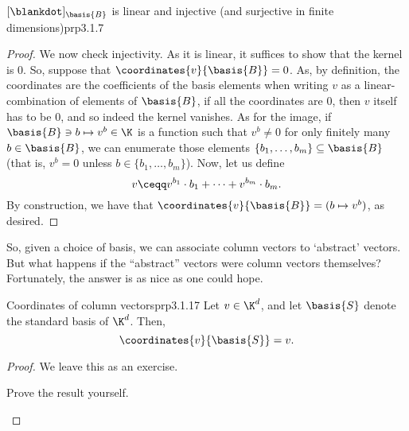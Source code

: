 \begin{prp}{$[\blankdot ]_{\basis{B}}$ is linear and injective (and surjective in finite dimensions)}{prp3.1.7}
\begin{proof}
	We now check injectivity.  As it is linear, it suffices to show that the kernel is $0$.  So, suppose that $\coordinates{v}{\basis{B}}=0$.  As, by definition, the coordinates are the coefficients of the basis elements when writing $v$ as a linear-combination of elements of $\basis{B}$, if all the coordinates are $0$, then $v$ itself has to be $0$, and so indeed the kernel vanishes.  As for the image, if $\basis{B}\ni b\mapsto v^b\in \K$ is a function such that $v^b\neq 0$ for only finitely many $b\in \basis{B}$, we can enumerate those elements $\{ b_1,\ldots ,b_m\} \subseteq \basis{B}$ (that is, $v^b=0$ unless $b\in \{ b_1,\ldots ,b_m\}$).  Now, let us define
	\begin{equation}
		v\ceqq v^{b_1}\cdot b_1+\cdots +v^{b_m}\cdot b_m.
	\end{equation}
	By construction, we have that $\coordinates{v}{\basis{B}}=(b\mapsto v^b)$, as desired.
\end{proof}
\end{prp}
So, given a choice of basis, we can associate column vectors to `abstract' vectors.  But what happens if the ``abstract'' vectors were column vectors themselves?  Fortunately, the answer is as nice as one could hope.
\begin{prp}{Coordinates of column vectors}{prp3.1.17}
	Let $v\in \K ^d$, and let $\basis{S}$ denote the standard basis of $\K ^d$.  Then,
	\begin{equation}
		\coordinates{v}{\basis{S}}=v.
	\end{equation}
	\begin{proof}
		We leave this as an exercise.
		\begin{exr}[breakable=false]{}{}
			Prove the result yourself.
		\end{exr}
	\end{proof}
\end{prp}
